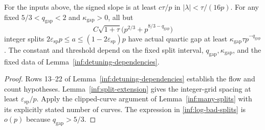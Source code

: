 \begin{corollary}
\label{inf:log-flow-count}
For the inputs above, the signed slope is at least $c\tau/p$ in
$|\lambda|<\tau/(16p)$. For any fixed $5/3<q_{\mathrm{gap}}<2$
and $\kappa_{\mathrm{gap}}>0$, all but
\begin{equation}\label{inf:log-bad-splits}
 C\sqrt{1+\tau}\bigl(p^{2/3}+p^{8/3-q_{\mathrm{gap}}}\bigr)
\end{equation}
integer splits $2\varepsilon_{\mathrm{sp}}p\le a\le
(1-2\varepsilon_{\mathrm{sp}})p$ have actual quartic gap at least
$\kappa_{\mathrm{gap}}\tau p^{-q_{\mathrm{gap}}}$.
The constant and threshold depend on the fixed split interval,
$q_{\mathrm{gap}},\kappa_{\mathrm{gap}}$, and the fixed data of
Lemma~\ref{inf:detuning-dependencies}.
\end{corollary}
\begin{proof}
Rows 13--22 of Lemma~\ref{inf:detuning-dependencies} establish the
flow and count hypotheses. Lemma~\ref{inf:split-extension} gives the
integer-grid spacing at least $\varepsilon_{\mathrm{sp}}/p$. Apply the clipped-curve
argument of Lemma~\ref{inf:many-splits} with its explicitly stated
number of curves. The expression in \eqref{inf:log-bad-splits}
is $o(p)$ because $q_{\mathrm{gap}}>5/3$.
\end{proof}
